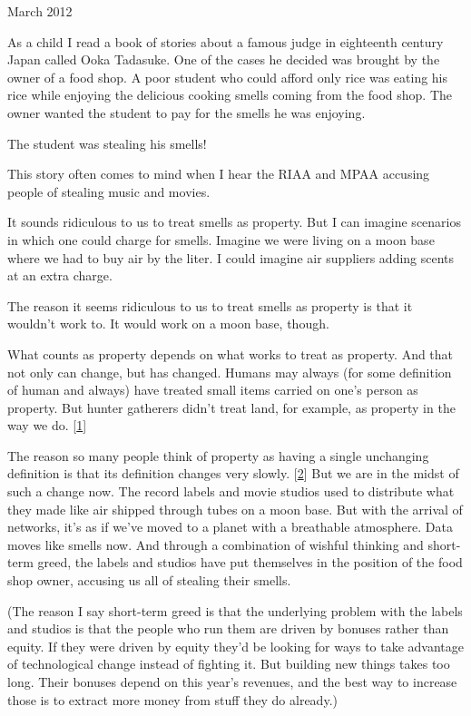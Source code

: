 March 2012

As a child I read a book of stories about a famous judge in eighteenth
century Japan called Ooka Tadasuke. One of the cases he decided was
brought by the owner of a food shop. A poor student who could afford
only rice was eating his rice while enjoying the delicious cooking
smells coming from the food shop. The owner wanted the student to pay
for the smells he was enjoying.

The student was stealing his smells!

This story often comes to mind when I hear the RIAA and MPAA accusing
people of stealing music and movies.

It sounds ridiculous to us to treat smells as property. But I can
imagine scenarios in which one could charge for smells. Imagine we were
living on a moon base where we had to buy air by the liter. I could
imagine air suppliers adding scents at an extra charge.

The reason it seems ridiculous to us to treat smells as property is that
it wouldn't work to. It would work on a moon base, though.

What counts as property depends on what works to treat as property. And
that not only can change, but has changed. Humans may always (for some
definition of human and always) have treated small items carried on
one's person as property. But hunter gatherers didn't treat land, for
example, as property in the way we do. {[}\hyperref[f1n]{1}{]}

The reason so many people think of property as having a single
unchanging definition is that its definition changes very slowly.
{[}\hyperref[f2n]{2}{]} But we are in the midst of such a change now.
The record labels and movie studios used to distribute what they made
like air shipped through tubes on a moon base. But with the arrival of
networks, it's as if we've moved to a planet with a breathable
atmosphere. Data moves like smells now. And through a combination of
wishful thinking and short-term greed, the labels and studios have put
themselves in the position of the food shop owner, accusing us all of
stealing their smells.

(The reason I say short-term greed is that the underlying problem with
the labels and studios is that the people who run them are driven by
bonuses rather than equity. If they were driven by equity they'd be
looking for ways to take advantage of technological change instead of
fighting it. But building new things takes too long. Their bonuses
depend on this year's revenues, and the best way to increase those is to
extract more money from stuff they do already.)

